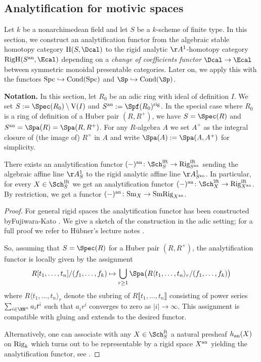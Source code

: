 \documentclass[colorinlistoftodos,article,11pt,reqno]{article}
\newcommand{\RigH}{\textup{RigH}}
\newcommand{\rig}{\textup{rig}}
\newcommand{\Sm}{\textup{Sm}}
\newcommand{\Rig}{\textup{Rig}}
\newcommand{\SmRig}{\textup{SmRig}}
\newcommand{\Cond}{\textup{Cond}}
\newcommand{\Spc}{\textup{Spc}}
\newcommand{\an}{\textup{an}}
\newcommand{\ft}{\textup{ft}}
\newcommand{\lft}{\textup{lft}}
\newcommand{\Arig}{\AA^{1}}
\newcommand{\skp}[1]{\langle #1 \rangle}
\renewcommand{\to}[1][]{\overset{#1}{\rightarrow}}
\newcommand{\inj}[1][]{\overset{#1}{\hookrightarrow}}		%
\newcommand{\infcats}{categories}
\begin{document}
\subsection{Analytification for motivic spaces}


Let $k$ be a nonarchimedean field and let $S$ be a $k$-scheme of finite type. In this section, we construct an analytification functor from the algebraic stable homotopy category $\textup{H}(S,\Dcal)$ to the rigid analytic $\Arig$-homotopy category $\RigH(S^\an,\Ecal)$ depending on a \emph{change of coefficients functor} $\Dcal\to\Ecal$ between symmetric monoidal presentable \infcats. Later on, we apply this with the functors $\Spc\inj\Cond(\Spc)$ and $\Sp\inj\Cond(\Sp)$.

\vspace{6pt}\noindent\textbf{Notation.}
In this section, let $R_0$ be an adic ring with ideal of definition $I$. We set $S:=\Spec(R_0)\setminus\textup{V}(I)$ and $S^\an:=\Spf(R_0)^\rig$.
In the special case where $R_0$ is a ring of definition of a Huber pair $(R,R^+)$, we  have $S=\Spec(R)$ and $S^\an=\Spa(R)=\Spa(R,R^+)$. For any $R$-algebra $A$ we set $A^+$ as the integral closure of (the image of) $R^+$ in $A$ and write $\Spa(A):=\Spa(A,A^+)$ for simplicity.

\begin{lemma} \label{analytification-functor--lem}
There exists an analytification functor $(-)^\an \colon \Sch_S^\lft \to \Rig_{S^\an}^\lft$ sending the algebraic affine line $\Arig_S$ to the rigid analytic affine line $\Arig_{S^\an}$. In particular, for every $X\in\Sch^\lft_S$ we get an analytification functor $(-)^\an \colon \Sch_X^\lft \to \Rig_{X^\an}^\lft$. By restriction, we get a functor $(-)^\an\colon\Sm_X\to\SmRig_{X^\an}$.
\end{lemma}
\begin{proof}
For general rigid spaces the analytification functor has been constructed by\linebreak Fujiwara-Kato \cite[ch.~2, sec.~9.1.]{fuji-kato}. We give a sketch of the construction in the adic setting; for a full proof we refer to Hübner's lecture notes \cite[\S 1.10]{huebner-adic}.  

So, assuming that $S=\Spec(R)$ for a Huber pair $(R,R^+)$, the analytification functor is locally given by the assignment
\[
	R[t_1,\ldots,t_n]/(f_1,\ldots,f_k) \mapsto \bigcup_{r\geq 1} \Spa\bigl( R\skp{t_1,\ldots,t_n}_r/(f_1,\ldots,f_k)\bigr)
\]
where $R\skp{t_1,\ldots,t_n}_r$ denote the subring of $R\llbracket t_1,\ldots,t_n\rrbracket$ consisting of power series\linebreak $\sum_{i\in\NN^n}a_it^i$ such that $a_ir^i$ converges to zero as $|i|\to\infty$. This assignment is compatible with gluing and extends to the desired functor.

Alternatively, one can associate with any $X\in\Sch_S^\ft$ a natural presheaf $h_\an(X)$ on $\Rig_k$ which turns out to be representable by a rigid space $X^\an$ yielding the analytification functor, see  \cite[\S 1.1.3]{AyoubRig}.


\end{proof}
\end{document}
